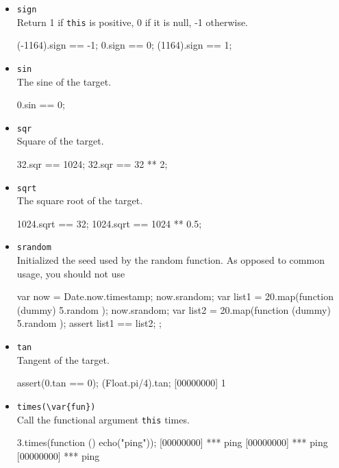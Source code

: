 \begin{itemize}
\item \lstinline|sign|\\
  Return 1 if \lstinline|this| is positive, 0 if it is null, -1
  otherwise.
\begin{urbiassert}
(-1164).sign == -1;
0.sign       == 0;
(1164).sign  == 1;
\end{urbiassert}

\item \lstinline|sin|\\
  The sine of the target.
\begin{urbiassert}
0.sin == 0;
\end{urbiassert}

\item \lstinline|sqr|\\
  Square of the target.
\begin{urbiassert}
32.sqr == 1024;
32.sqr == 32 ** 2;
\end{urbiassert}

\item \lstinline|sqrt|\\
  The square root of the target.
\begin{urbiassert}
1024.sqrt == 32;
1024.sqrt == 1024 ** 0.5;
\end{urbiassert}

\item \lstinline|srandom|\\
  Initialized the seed used by the random function.  As opposed to common
  usage, you should not use
\begin{urbiunchecked}
{
  var now = Date.now.timestamp;
  now.srandom;
  var list1 = 20.map(function (dummy) { 5.random });
  now.srandom;
  var list2 = 20.map(function (dummy) { 5.random });
  assert
  {
    list1 == list2;
  }
};
\end{urbiunchecked}

\item \lstinline|tan|\\
  Tangent of the target.
\begin{urbiscript}
assert(0.tan == 0);
(Float.pi/4).tan;
[00000000] 1
\end{urbiscript}

\item \lstinline|times(\var{fun})|\\
  Call the functional argument  \lstinline|this| times.

\begin{urbiscript}
3.times(function () { echo("ping")});
[00000000] *** ping
[00000000] *** ping
[00000000] *** ping
\end{urbiscript}


\end{itemize}
